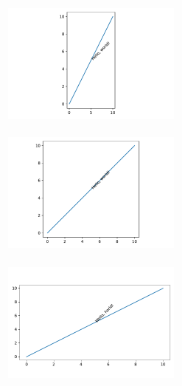 

\begin{center}
    \includegraphics[width = 0.33\textwidth]{figures/proseplots/text-rotation2.pdf}
\end{center} \begin{center}
    \includegraphics[width = 0.33\textwidth]{figures/proseplots/text-rotation1.pdf}
\end{center} \begin{center}
    \includegraphics[width = 0.33\textwidth]{figures/proseplots/text-rotation05.pdf}
\end{center}





